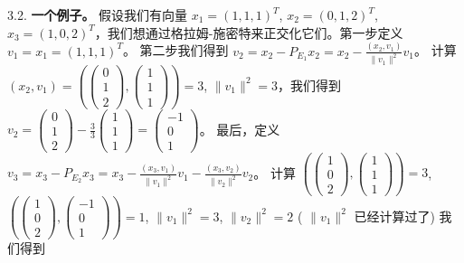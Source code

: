 3.2. \textbf{一个例子。} 假设我们有向量 $x_1 = (1, 1, 1)^T$, $x_2 = (0, 1, 2)^T$, $x_3 = (1, 0, 2)^T$，我们想通过格拉姆-施密特来正交化它们。第一步定义 $v_1 = x_1 = (1, 1, 1)^T$。
第二步我们得到 $v_2 = x_2 - P_{E_1} x_2 = x_2 - \frac{(x_2, v_1)}{\|v_1\|^2} v_1$。
计算 $(x_2, v_1) = (\begin{pmatrix} 0 \\ 1 \\ 2 \end{pmatrix}, \begin{pmatrix} 1 \\ 1 \\ 1 \end{pmatrix}) = 3$, $\|v_1\|^2 = 3$，我们得到
$v_2 = \begin{pmatrix} 0 \\ 1 \\ 2 \end{pmatrix} - \frac{3}{3} \begin{pmatrix} 1 \\ 1 \\ 1 \end{pmatrix} = \begin{pmatrix} -1 \\ 0 \\ 1 \end{pmatrix}$。
最后，定义 $v_3 = x_3 - P_{E_2} x_3 = x_3 - \frac{(x_3, v_1)}{\|v_1\|^2} v_1 - \frac{(x_3, v_2)}{\|v_2\|^2} v_2$。
计算 $(\begin{pmatrix} 1 \\ 0 \\ 2 \end{pmatrix}, \begin{pmatrix} 1 \\ 1 \\ 1 \end{pmatrix}) = 3$, $(\begin{pmatrix} 1 \\ 0 \\ 2 \end{pmatrix}, \begin{pmatrix} -1 \\ 0 \\ 1 \end{pmatrix}) = 1$, $\|v_1\|^2 = 3$, $\|v_2\|^2 = 2$ ( $\|v_1\|^2$ 已经计算过了) 我们得到
